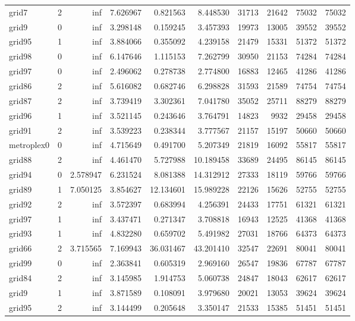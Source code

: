 \begin{longtable}{|l|r|r|r|r|r|r|r|r|r|}
grid7 & 2 & inf & 7.626967 & 0.821563 & 8.448530 & 31713 & 21642 & 75032 & 75032 \\
grid9 & 0 & inf & 3.298148 & 0.159245 & 3.457393 & 19973 & 13005 & 39552 & 39552 \\
grid95 & 1 & inf & 3.884066 & 0.355092 & 4.239158 & 21479 & 15331 & 51372 & 51372 \\
grid98 & 0 & inf & 6.147646 & 1.115153 & 7.262799 & 30950 & 21153 & 74284 & 74284 \\
grid97 & 0 & inf & 2.496062 & 0.278738 & 2.774800 & 16883 & 12465 & 41286 & 41286 \\
grid86 & 2 & inf & 5.616082 & 0.682746 & 6.298828 & 31593 & 21589 & 74754 & 74754 \\
grid87 & 2 & inf & 3.739419 & 3.302361 & 7.041780 & 35052 & 25711 & 88279 & 88279 \\
grid96 & 1 & inf & 3.521145 & 0.243646 & 3.764791 & 14823 & 9932 & 29458 & 29458 \\
grid91 & 2 & inf & 3.539223 & 0.238344 & 3.777567 & 21157 & 15197 & 50660 & 50660 \\
metroplex0 & 0 & inf & 4.715649 & 0.491700 & 5.207349 & 21819 & 16092 & 55817 & 55817 \\
grid88 & 2 & inf & 4.461470 & 5.727988 & 10.189458 & 33689 & 24495 & 86145 & 86145 \\
grid94 & 0 & 2.578947 & 6.231524 & 8.081388 & 14.312912 & 27333 & 18119 & 59766 & 59766 \\
grid89 & 1 & 7.050125 & 3.854627 & 12.134601 & 15.989228 & 22126 & 15626 & 52755 & 52755 \\
grid92 & 2 & inf & 3.572397 & 0.683994 & 4.256391 & 24433 & 17751 & 61321 & 61321 \\
grid97 & 1 & inf & 3.437471 & 0.271347 & 3.708818 & 16943 & 12525 & 41368 & 41368 \\
grid93 & 1 & inf & 4.832280 & 0.659702 & 5.491982 & 27031 & 18766 & 64373 & 64373 \\
grid66 & 2 & 3.715565 & 7.169943 & 36.031467 & 43.201410 & 32547 & 22691 & 80041 & 80041 \\
grid99 & 0 & inf & 2.363841 & 0.605319 & 2.969160 & 26547 & 19836 & 67787 & 67787 \\
grid84 & 2 & inf & 3.145985 & 1.914753 & 5.060738 & 24847 & 18043 & 62617 & 62617 \\
grid9 & 1 & inf & 3.871589 & 0.108091 & 3.979680 & 20021 & 13053 & 39624 & 39624 \\
grid95 & 2 & inf & 3.144499 & 0.205648 & 3.350147 & 21533 & 15385 & 51451 & 51451 \\

\end{longtable}
